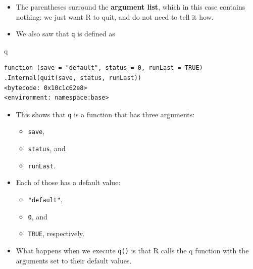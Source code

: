 \documentclass[
  9pt,
  a4paper,
  ignorenonframetext,
  notheorems]{beamer}
\newenvironment{Shaded}{\begin{snugshade}}{\end{snugshade}}
\newcommand{\NormalTok}[1]{\textcolor[rgb]{0.00,0.23,0.31}{#1}}
\providecommand{\tightlist}{%
  \setlength{\itemsep}{0pt}\setlength{\parskip}{0pt}}\usepackage{longtable,booktabs,array}
\begin{document}
\begin{frame}[fragile]
\begin{itemize}
\item
  The parentheses surround the \textbf{argument list}, which in this
  case contains nothing: we just want R to quit, and do not need to tell
  it how.
\item
  We also saw that \texttt{q} is defined as
\end{itemize}

\begin{Shaded}
\begin{Highlighting}[]
\NormalTok{q}
\end{Highlighting}
\end{Shaded}

\begin{verbatim}
function (save = "default", status = 0, runLast = TRUE) 
.Internal(quit(save, status, runLast))
<bytecode: 0x10c1c62e8>
<environment: namespace:base>
\end{verbatim}

\begin{itemize}
\tightlist
\item
  This shows that \texttt{q} is a function that has three arguments:

  \begin{itemize}
  \tightlist
  \item
    \texttt{save},
  \item
    \texttt{status}, and
  \item
    \texttt{runLast}.
  \end{itemize}
\item
  Each of those has a default value:

  \begin{itemize}
  \tightlist
  \item
    \texttt{"default"},
  \item
    \texttt{0}, and
  \item
    \texttt{TRUE}, respectively.
  \end{itemize}
\item
  What happens when we execute \texttt{q()} is that R calls the q
  function with the arguments set to their default values.
\end{itemize}
\end{frame}
\end{document}
